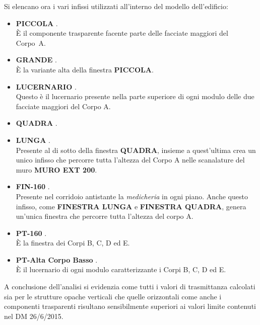 Si elencano ora i vari infissi utilizzati all'interno del modello dell'edificio:
\begin{itemize}
	\item \textbf{PICCOLA} .\\ È il componente trasparente facente parte delle facciate maggiori del Corpo~A. 
	\item \textbf{GRANDE} .\\ È la variante alta della finestra \textbf{PICCOLA}. 
	\item \textbf{LUCERNARIO} .\\ Questo è il lucernario presente nella parte superiore di ogni modulo delle due facciate maggiori del Corpo A. 
	\item \textbf{QUADRA} .
	\item \textbf{LUNGA} .\\ Presente al di sotto della finestra \textbf{QUADRA}, insieme a quest'ultima crea un unico infisso che percorre tutta l'altezza del Corpo A nelle scanalature del muro \textbf{MURO EXT 200}. 
	\item \textbf{FIN-160} . \\ Presente nel corridoio antistante la \emph{medicheria} in ogni piano. Anche questo infisso, come \textbf{FINESTRA LUNGA} e \textbf{FINESTRA QUADRA}, genera un'unica finestra che percorre tutta l'altezza del corpo A.
	\item \textbf{PT-160} . \\ È la finestra dei Corpi B, C, D ed E. 
	\item \textbf{PT-Alta Corpo Basso} .\\ È il lucernario di ogni modulo caratterizzante i Corpi B, C, D ed E. 
\end{itemize}

A conclusione dell'analisi si evidenzia come tutti i valori di trasmittanza calcolati sia per le strutture opache verticali che quelle orizzontali come anche i componenti trasparenti risultano sensibilmente superiori ai valori limite contenuti nel DM 26/6/2015.

